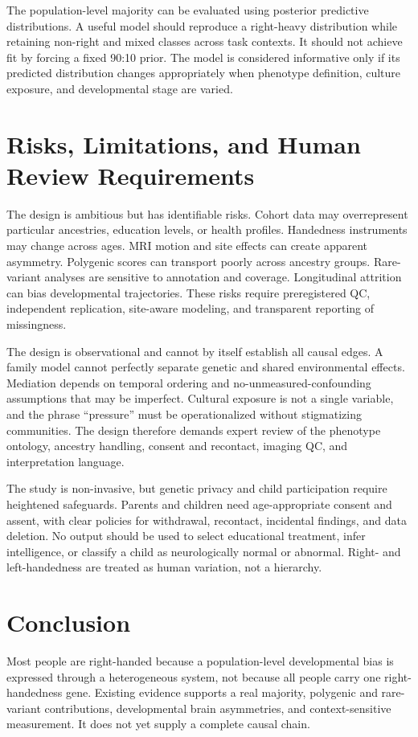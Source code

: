 \documentclass[10pt,conference]{IEEEtran}
\begin{document}
The population-level majority can be evaluated using posterior predictive distributions. A useful model should reproduce a right-heavy distribution while retaining non-right and mixed classes across task contexts. It should not achieve fit by forcing a fixed 90:10 prior. The model is considered informative only if its predicted distribution changes appropriately when phenotype definition, culture exposure, and developmental stage are varied.

\section{Risks, Limitations, and Human Review Requirements}
The design is ambitious but has identifiable risks. Cohort data may overrepresent particular ancestries, education levels, or health profiles. Handedness instruments may change across ages. MRI motion and site effects can create apparent asymmetry. Polygenic scores can transport poorly across ancestry groups. Rare-variant analyses are sensitive to annotation and coverage. Longitudinal attrition can bias developmental trajectories. These risks require preregistered QC, independent replication, site-aware modeling, and transparent reporting of missingness.

The design is observational and cannot by itself establish all causal edges. A family model cannot perfectly separate genetic and shared environmental effects. Mediation depends on temporal ordering and no-unmeasured-confounding assumptions that may be imperfect. Cultural exposure is not a single variable, and the phrase ``pressure'' must be operationalized without stigmatizing communities. The design therefore demands expert review of the phenotype ontology, ancestry handling, consent and recontact, imaging QC, and interpretation language.

The study is non-invasive, but genetic privacy and child participation require heightened safeguards. Parents and children need age-appropriate consent and assent, with clear policies for withdrawal, recontact, incidental findings, and data deletion. No output should be used to select educational treatment, infer intelligence, or classify a child as neurologically normal or abnormal. Right- and left-handedness are treated as human variation, not a hierarchy.

\section{Conclusion}
Most people are right-handed because a population-level developmental bias is expressed through a heterogeneous system, not because all people carry one right-handedness gene. Existing evidence supports a real majority, polygenic and rare-variant contributions, developmental brain asymmetries, and context-sensitive measurement. It does not yet supply a complete causal chain.
\end{document}

